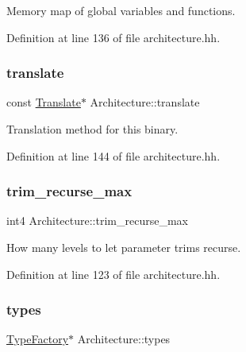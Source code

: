 Memory map of global variables and functions. 



Definition at line 136 of file architecture.\+hh.

\mbox{\label{class_architecture_a81f2db17fdc609a7d1cedbc0a2eb7753}} 
\subsubsection{\texorpdfstring{translate}{translate}}
{\footnotesize\ttfamily const \mbox{\hyperlink{class_translate}{Translate}}$\ast$ Architecture\+::translate}



Translation method for this binary. 



Definition at line 144 of file architecture.\+hh.

\mbox{\label{class_architecture_adbb294ba6c3bb21f691e0208c1ac53a1}} 
\subsubsection{\texorpdfstring{trim\_recurse\_max}{trim\_recurse\_max}}
{\footnotesize\ttfamily int4 Architecture\+::trim\+\_\+recurse\+\_\+max}



How many levels to let parameter trims recurse. 



Definition at line 123 of file architecture.\+hh.

\mbox{\label{class_architecture_a8225ba7bd6ac802660e03ee793289dd1}} 
\subsubsection{\texorpdfstring{types}{types}}
{\footnotesize\ttfamily \mbox{\hyperlink{class_type_factory}{Type\+Factory}}$\ast$ Architecture\+::types}



